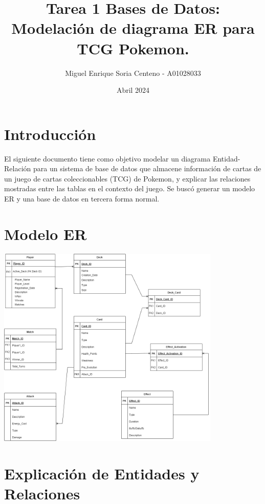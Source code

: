 \documentclass{article}
\title{Tarea 1 Bases de Datos: Modelación de diagrama ER para TCG Pokemon.}
\author{Miguel Enrique Soria Centeno - A01028033}
\date{Abril 2024}
\begin{document}
\maketitle

\section{Introducción}
El siguiente documento tiene como objetivo modelar un diagrama Entidad-Relación para un sistema de base de datos que almacene información de cartas de un juego de cartas coleccionables (TCG) de Pokemon, y explicar las relaciones mostradas entre las tablas en el contexto del juego. Se buscó generar un modelo ER y una base de datos en tercera forma normal. 

\section{Modelo ER}
\begin{center}
  \includegraphics[width=0.8\textwidth]{PokemonTCG_ER.png}
\end{center}

\section{Explicación de Entidades y Relaciones}
\end{document}
